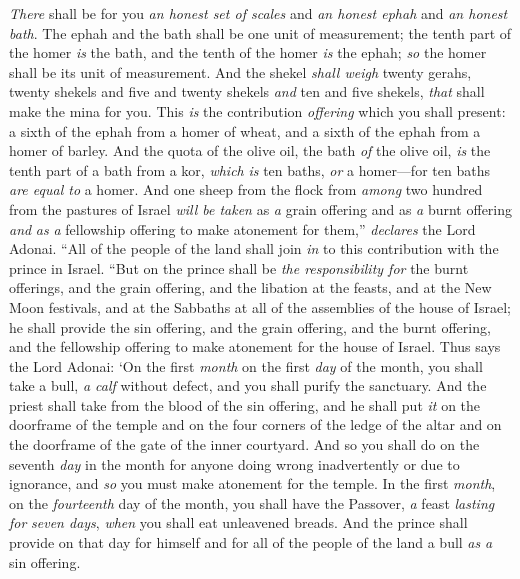 \begin{biblechapter}
\verse \textit{There} shall be for you \textit{an honest set of scales} and \textit{an honest ephah} and \textit{an honest bath}.
\verse The ephah and the bath shall be one unit of measurement; the tenth part of the homer \textit{is} the bath, and the tenth of the homer \textit{is} the ephah; \textit{so} the homer shall be its unit of measurement.
\verse And the shekel \textit{shall weigh} twenty gerahs, twenty shekels and five and twenty shekels \textit{and} ten and five shekels, \textit{that} shall make the mina for you.
\verse This \textit{is} the contribution \textit{offering} which you shall present: a sixth of the ephah from a homer of wheat, and a sixth of the ephah from a homer of barley.
\verse And the quota of the olive oil, the bath \textit{of} the olive oil, \textit{is} the tenth part of a bath from a kor, \textit{which} \textit{is} ten baths, \textit{or} a homer—for ten baths \textit{are equal to} a homer.
\verse And one sheep from the flock from \textit{among} two hundred from the pastures of Israel \textit{will be taken} as \textit{a} grain offering and as \textit{a} burnt offering \textit{and} \textit{as} \textit{a} fellowship offering to make atonement for them,” \textit{declares} the Lord Adonai.
\verse “All of the people of the land shall join \textit{in} to this contribution with the prince in Israel.
\verse “But on the prince shall be \textit{the responsibility for} the burnt offerings, and the grain offering, and the libation at the feasts, and at the New Moon festivals, and at the Sabbaths at all of the assemblies of the house of Israel; he shall provide the sin offering, and the grain offering, and the burnt offering, and the fellowship offering to make atonement for the house of Israel.
\verse Thus says the Lord Adonai: ‘On the first \textit{month} on the first \textit{day} of the month, you shall take a bull, \textit{a calf} without defect, and you shall purify the sanctuary.
\verse And the priest shall take from the blood of the sin offering, and he shall put \textit{it} on the doorframe of the temple and on the four corners of the ledge of the altar and on the doorframe of the gate of the inner courtyard.
\verse And so you shall do on the seventh \textit{day} in the month for anyone doing wrong inadvertently or due to ignorance, and \textit{so} you must make atonement for the temple.
\verse In the first \textit{month}, on the \textit{fourteenth} day of the month, you shall have the Passover, \textit{a} feast \textit{lasting for} \textit{seven days}, \textit{when} you shall eat unleavened breads.
\verse And the prince shall provide on that day for himself and for all of the people of the land a bull \textit{as} \textit{a} sin offering.

\end{biblechapter}
